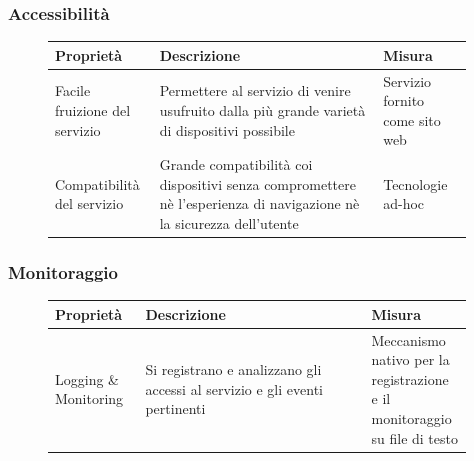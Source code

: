 \documentclass{article}
\begin{document}
\clearpage

\subsubsection{Accessibilità}\label{rnf_6}
\begin{description}
	\item[]
	    
	\begin{table}[!htbp]
		\begin{tabular} {|>{\raggedright\arraybackslash}m{0.20\linewidth} | >{\raggedright\arraybackslash}m{0.50\linewidth}|>{\raggedright\arraybackslash}m{0.20\linewidth}|}
			\hline
			\textbf{Proprietà}                                                                                                        &   
			\textbf{Descrizione}                                                                                                       &   
			\textbf{Misura} \\ \hline
			Facile fruizione del servizio                                                                                              &   
			Permettere al servizio di venire usufruito dalla più grande varietà di dispositivi possibile                             &   
			Servizio fornito come sito web \\ \hline
			Compatibilità del servizio                                                                                                &   
			Grande compatibilità coi dispositivi senza compromettere nè l’esperienza di navigazione nè la sicurezza dell’utente &   
			Tecnologie ad-hoc \\ \hline
		\end{tabular}
	\end{table}
	    
\end{description}

\subsubsection{Monitoraggio}\label{rnf_7}
\begin{description}
	\item[]
	    
	\begin{table}[!htbp]
		\begin{tabular} {|>{\raggedright\arraybackslash}m{0.20\linewidth} | >{\raggedright\arraybackslash}m{0.50\linewidth}|>{\raggedright\arraybackslash}m{0.20\linewidth}|}
			\hline
			\textbf{Proprietà}                                                        &   
			\textbf{Descrizione}                                                       &   
			\textbf{Misura} \\ \hline
			Logging \& Monitoring                                                      &   
			Si registrano e analizzano gli accessi al servizio e gli eventi pertinenti &   
			Meccanismo nativo per la registrazione e il monitoraggio su file di testo \\ \hline
		\end{tabular}
	\end{table}
	    
\end{description}
\end{document}
